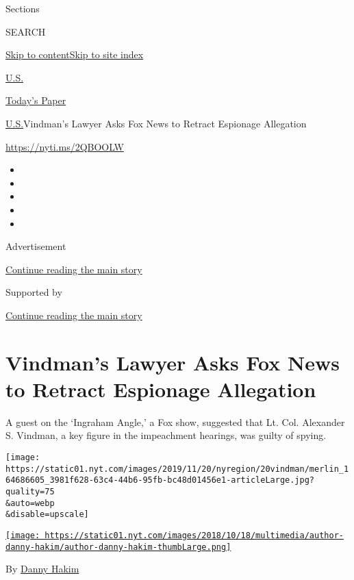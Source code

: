 Sections

SEARCH

\protect\hyperlink{site-content}{Skip to
content}\protect\hyperlink{site-index}{Skip to site index}

\href{https://www.nytimes.com/section/us}{U.S.}

\href{https://myaccount.nytimes.com/auth/login?response_type=cookie\&client_id=vi}{}

\href{https://www.nytimes.com/section/todayspaper}{Today's Paper}

\href{/section/us}{U.S.}\textbar{}Vindman's Lawyer Asks Fox News to
Retract Espionage Allegation

\url{https://nyti.ms/2QBOOLW}

\begin{itemize}
\item
\item
\item
\item
\item
\end{itemize}

Advertisement

\protect\hyperlink{after-top}{Continue reading the main story}

Supported by

\protect\hyperlink{after-sponsor}{Continue reading the main story}

\hypertarget{vindmans-lawyer-asks-fox-news-to-retract-espionage-allegation}{%
\section{Vindman's Lawyer Asks Fox News to Retract Espionage
Allegation}\label{vindmans-lawyer-asks-fox-news-to-retract-espionage-allegation}}

A guest on the `Ingraham Angle,' a Fox show, suggested that Lt. Col.
Alexander S. Vindman, a key figure in the impeachment hearings, was
guilty of spying.

\texttt{[image: https://static01.nyt.com/images/2019/11/20/nyregion/20vindman/merlin\_164686605\_3981f628-63c4-44b6-95fb-bc48d01456e1-articleLarge.jpg?quality=75\\\&auto=webp\\\&disable=upscale]}

\href{https://www.nytimes.com/by/danny-hakim}{\texttt{[image: https://static01.nyt.com/images/2018/10/18/multimedia/author-danny-hakim/author-danny-hakim-thumbLarge.png]}}

By \href{https://www.nytimes.com/by/danny-hakim}{Danny Hakim}

